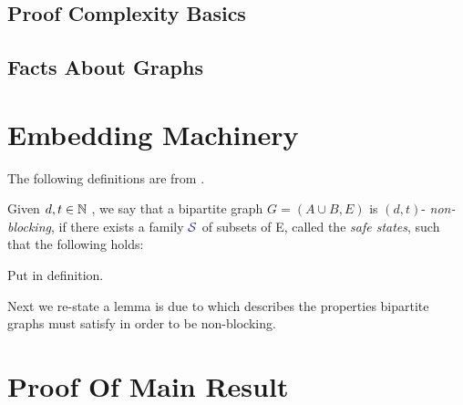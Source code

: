 \documentclass[11pt]{article}
\newcommand{\Graph}{G}
\newcommand{\Family}[1]{\textcolor{purple}{\mathcal{#1}}}
\begin{document}
\subsection{Proof Complexity Basics}

\subsection{Facts About Graphs}

\section{Embedding Machinery}

The following definitions are from \citep{nenadov2023routing}.

\begin{definition}
Given $d, t \in \mathbb{N}$ , we say that a bipartite graph $\Graph = (A \cup B, E)$ is $(d,t)$- \emph{non-blocking}, if there exists a family $\Family{S}$ of subsets of E, called the \emph{safe states}, such that the following holds:
\end{definition}


\begin{definition}\label{def:expander-graphs}
Put in definition.    
\end{definition}

Next we re-state a lemma is due to \citep[Proposition 1]{feldman1988wide} which describes the properties bipartite graphs must satisfy in order to be non-blocking.
\begin{lemma}

\end{lemma}

\section{Proof Of Main Result}

\clearpage


\end{document}
